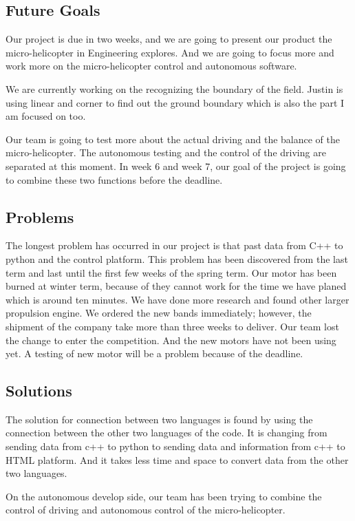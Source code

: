 \documentclass[onecolumn, draftclsnofoot,10pt, compsoc]{IEEEtran}
\begin{document}
\subsection{Future Goals}

Our project is due in two weeks, and we are going to present our product the micro-helicopter in Engineering explores. And we are going to focus more and work more on the micro-helicopter control and autonomous software.

We are currently working on the recognizing the boundary of the field. Justin is using linear and corner to find out the ground boundary which is also the part I am focused on too.

Our team is going to test more about the actual driving and the balance of the micro-helicopter. The autonomous testing and the control of the driving are separated at this moment. In week 6 and week 7, our goal of the project is going to combine these two functions before the deadline.

\subsection{Problems}

The longest problem has occurred in our project is that past data from C++ to python and the control platform. This problem has been discovered from the last term and last until the first few weeks of the spring term. Our motor has been burned at winter term, because of they cannot work for the time we have planed which is around ten minutes. We have done more research and found other larger propulsion engine. We ordered the new bands immediately; however, the shipment of the company take more than three weeks to deliver. Our team lost the change to enter the competition. And the new motors have not been using yet. A testing of new motor will be a problem because of the deadline.

\subsection{Solutions}

The solution for connection between two languages is found by using the connection between the other two languages of the code. It is changing from sending data from c++ to python to sending data and information from c++ to HTML platform. And it takes less time and space to convert data from the other two languages.

On the autonomous develop side, our team has been trying to combine the control of driving and autonomous control of the micro-helicopter. 
\end{document}
